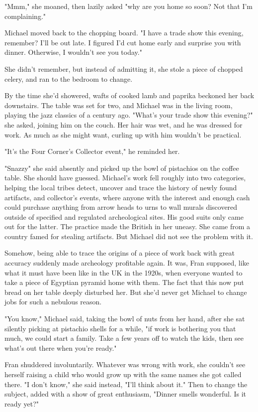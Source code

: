\documentclass{article}
\begin{document}
"Mmm," she moaned, then lazily asked "why are you home so soon? Not that I'm complaining."

Michael moved back to the chopping board. "I have a trade show this evening, remember? I'll be out late. I figured I'd cut home early and surprise you with dinner. Otherwise, I wouldn't see you today."

She didn't remember, but instead of admitting it, she stole a piece of chopped celery, and ran to the bedroom to change.

By the time she'd showered, wafts of cooked lamb and paprika beckoned her back downstairs. The table was set for two, and Michael was in the living room, playing the jazz classics of a century ago. "What's your trade show this evening?" she asked, joining him on the couch. Her hair was wet, and he was dressed for work. As much as she might want, curling up with him wouldn't be practical.

"It’s the Four Corner's Collector event," he reminded her. 

"Snazzy" she said absently and picked up the bowl of pistachios on the coffee table. She should have guessed. Michael’s work fell roughly into two categories, helping the local tribes detect, uncover and trace the history of newly found artifacts, and collector’s events, where anyone with the interest and enough cash could purchase anything from arrow heads to urns to wall murals discovered outside of specified and regulated archeological sites. His good suits only came out for the latter. The practice made the British in her uneasy. She came from a country famed for stealing artifacts. But Michael did not see the problem with it. 

Somehow, being able to trace the origins of a piece of work back with great accuracy suddenly made archeology profitable again. It was, Fran supposed, like what it must have been like in the UK in the 1920s, when everyone wanted to take a piece of Egyptian pyramid home with them. The fact that this now put bread on her table deeply disturbed her. But she'd never get Michael to change jobs for such a nebulous reason.

"You know," Michael said, taking the bowl of nuts from her hand, after she sat silently picking at pistachio shells for a while, "if work is bothering you that much, we could start a family. Take a few years off to watch the kids, then see what's out there when you're ready."

Fran shuddered involuntarily. Whatever was wrong with work, she couldn't see herself raising a child who would grow up with the same names she got called there. "I don't know," she said instead, "I'll think about it." Then to change the subject, added with a show of great enthusiasm, "Dinner smells wonderful. Is it ready yet?"
\end{document}

